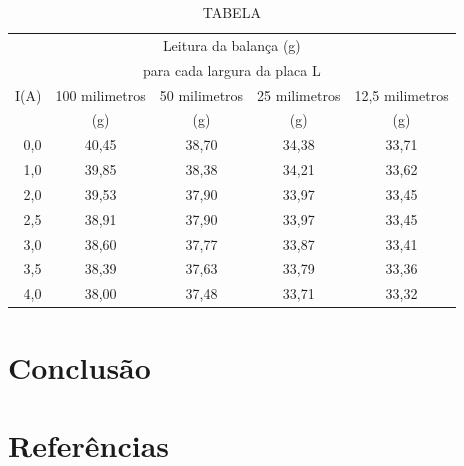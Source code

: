 \documentclass[twocolumn]{article}
\begin{document}
	\begin{table}
		\centering
		\caption{TABELA}
		\begin{tabular}[h]{r|cccc}
			\multicolumn{5}{c}{Leitura da balança (g)}\\
			\multicolumn{5}{c}{para cada largura da placa L}\\
			\hline
			I(A) & 100 milimetros & 50 milimetros & 25 milimetros & 12,5 milimetros\\
			     &   (g) &  (g) & (g) &  (g)\\
			\hline
			0,0 & 40,45 & 38,70 & 34,38 & 33,71 \\
			1,0 & 39,85 & 38,38 & 34,21 & 33,62\\
			2,0 & 39,53 & 37,90 & 33,97 & 33,45\\
			2,5 & 38,91 & 37,90 & 33,97 & 33,45\\
			3,0 & 38,60 & 37,77 & 33,87 & 33,41\\
			3,5 & 38,39 & 37,63 & 33,79 & 33,36\\
			4,0 & 38,00 & 37,48 & 33,71 & 33,32\\
			\hline
		\end{tabular}
	\end{table}




	\lipsum[3]

	\section*{Conclusão}

	\lipsum[5-6]


	\section*{Referências}

	
	\renewcommand{\refname}{}

	
\end{document}
